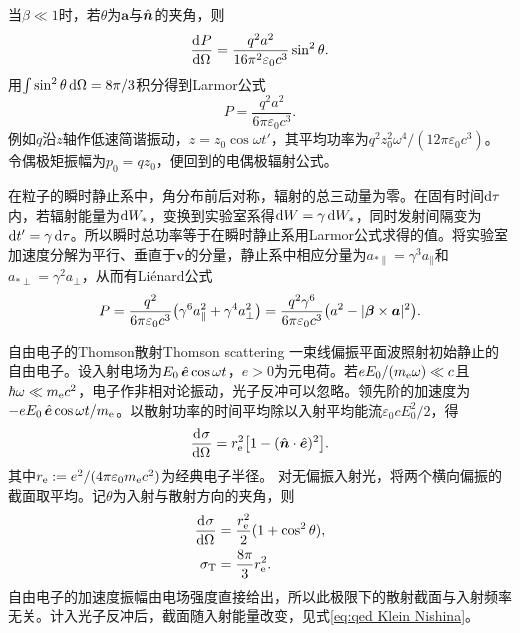 当$\beta \ll 1$时，若$\theta$为$\bm a$与$\mathop{}\!\hat{\bm{n}}$的夹角，则
\begin{equation}
    \label{eq:ed-nonrelativistic-angular-radiation}
    \frac{\mathop{}\!\mathrm{d}^{}P}{\mathrm{d}{\Omega}^{}} = \frac{q^2a^2}{16\pi^2\varepsilon_0c^3}\sin^2\theta.
\end{equation}
用$\textstyle \int\sin^2\theta\mathop{}\!\mathrm{d}\Omega = 8\pi/3$积分得到Larmor公式
\begin{equation}
    P = \frac{q^2a^2}{6\pi\varepsilon_0c^3}.
    \label{eqn:moving charge Larmor}
\end{equation}
例如$q$沿$z$轴作低速简谐振动，$z = z_0\cos\omega t'$，其平均功率为$q^2z_0^2\omega^4/(12\pi\varepsilon_0c^3)$。令偶极矩振幅为$p_0 = qz_0$，便回到的电偶极辐射公式。

在粒子的瞬时静止系中，角分布前后对称，辐射的总三动量为零。在固有时间$\mathop{}\!\mathrm{d}\tau$内，若辐射能量为$\mathop{}\!\mathrm{d} W_*$，变换到实验室系得$\mathop{}\!\mathrm{d} W = \gamma\mathop{}\!\mathrm{d} W_*$，同时发射间隔变为$\mathop{}\!\mathrm{d} t' = \gamma\mathop{}\!\mathrm{d}\tau$。所以瞬时总功率等于在瞬时静止系用Larmor公式求得的值。将实验室加速度分解为平行、垂直于$\bm v$的分量，静止系中相应分量为$a_{*\parallel} = \gamma^3a_\parallel$和$a_{*\perp} = \gamma^2a_\perp$，从而有Li\'enard公式
\begin{equation}
    P = \frac{q^2}{6\pi\varepsilon_0c^3}\bigl(\gamma^6a_\parallel^2 + \gamma^4a_\perp^2\bigr)
     = \frac{q^2\gamma^6}{6\pi\varepsilon_0c^3}\bigl(a^2 - \lvert\bm\beta \times \bm a\rvert^2\bigr).
    \label{eqn:moving charge Lienard}
\end{equation}

\begin{example}{自由电子的Thomson散射}{Thomson scattering}
    一束线偏振平面波照射初始静止的自由电子。设入射电场为$E_0\mathop{}\!\hat{\bm{e}}\cos\omega t$，$e > 0$为元电荷。若$eE_0/(m_{\mathrm{e}}\omega) \ll c$且$\hbar\omega \ll m_{\mathrm{e}} c^2$，电子作非相对论振动，光子反冲可以忽略。领先阶的加速度为$-eE_0\mathop{}\!\hat{\bm{e}}\cos\omega t/m_{\mathrm{e}}$。以散射功率的时间平均除以入射平均能流$\varepsilon_0cE_0^2/2$，得
    \begin{equation}
        \label{eq:ed-polarized-thomson}
        \frac{\mathop{}\!\mathrm{d}^{}\sigma}{\mathrm{d}{\Omega}^{}} = r_{\mathrm{e}}^2\bigl[1 - (\mathop{}\!\hat{\bm{n}} \cdot \mathop{}\!\hat{\bm{e}})^2\bigr].
    \end{equation}
    其中$r_{\mathrm{e}} := e^2/(4\pi\varepsilon_0 m_{\mathrm{e}} c^2)$为经典电子半径。
    对无偏振入射光，将两个横向偏振的截面取平均。记$\theta$为入射与散射方向的夹角，则
    \begin{subequations}
        \label{eq:ed-thomson-cross-sections}
        \begin{align}
            \frac{\mathop{}\!\mathrm{d}^{}\sigma}{\mathrm{d}{\Omega}^{}} &= \frac{r_{\mathrm{e}}^2}2(1 + \cos^2\theta),\\
            \sigma_\mathrm{T} &= \frac{8\pi}3r_{\mathrm{e}}^2.
        \end{align}
    \end{subequations}
    自由电子的加速度振幅由电场强度直接给出，所以此极限下的散射截面与入射频率无关。计入光子反冲后，截面随入射能量改变，见式\eqref{eq:qed Klein Nishina}。
\end{example}

